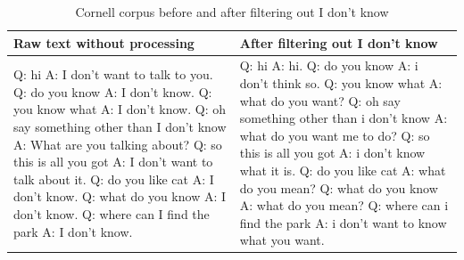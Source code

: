 \documentclass{article}
\begin{document}
\begin{table}[h]
    \caption{Cornell corpus before and after filtering out I don't know}
    \label{table:cornell-idk}
    \centering
\begin{tabular}{p{70mm}|p{70mm}}
  \toprule
  Raw text without processing & After filtering out I don't know \\
  \hline
  Q: hi \newline
A: I don't want to talk to you. \newline
Q: do you know \newline
A: I don't know. \newline
Q: you know what \newline
A: I don't know. \newline
Q: oh say something other than I don't know \newline
A: What are you talking about? \newline
Q: so this is all you got \newline
A: I don't want to talk about it. \newline
Q: do you like cat \newline
A: I don't know. \newline
Q: what do you know \newline
A: I don't know. \newline
Q: where can I find the park \newline
A: I don't know. \newline
  &
Q: hi \newline
A: hi. \newline
Q: do you know \newline
A: i don't think so. \newline
Q: you know what \newline
A: what do you want? \newline
Q: oh say something other than i don't know \newline
A: what do you want me to do? \newline
Q: so this is all you got \newline
A: i don't know what it is. \newline
Q: do you like cat \newline
A: what do you mean? \newline
Q: what do you know \newline
A: what do you mean? \newline
Q: where can i find the park \newline
A: i don't want to know what you want. \newline
  \\
  \bottomrule
\end{tabular}
\end{table}
\end{document}
